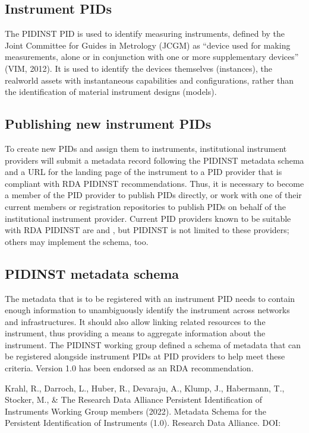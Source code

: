 \documentclass[a4paper,10pt,english]{sphinxmanual}
\begin{document}
\subsection{Instrument PIDs}
\label{\detokenize{white-paper/instrument-pids:instrument-pids}}\label{\detokenize{white-paper/instrument-pids::doc}}
\sphinxAtStartPar
The PIDINST PID is used to identify measuring instruments, defined by
the Joint Committee for Guides in Metrology (JCGM) as “device used for
making measurements, alone or in conjunction with one or more
supplementary devices” (VIM, 2012). It is used to identify the devices
themselves (instances), the real\sphinxhyphen{}world assets with instantaneous
capabilities and configurations, rather than the identification of
material instrument designs (models).


\subsection{Publishing new instrument PIDs}
\label{\detokenize{white-paper/publishing:publishing-new-instrument-pids}}\label{\detokenize{white-paper/publishing::doc}}
\sphinxAtStartPar
To create new PIDs and assign them to instruments, institutional
instrument providers will submit a metadata record following the PIDINST
metadata schema and a URL for the landing page of the instrument to a
PID provider that is compliant with RDA PIDINST recommendations. Thus,
it is necessary to become a member of the PID provider to publish PIDs
directly, or work with one of their current members or registration
repositories to publish PIDs on behalf of the institutional instrument
provider. Current PID providers known to be suitable with RDA PIDINST
are  and , but PIDINST is not limited to these
providers; others may implement the schema, too.


\subsection{PIDINST metadata schema}
\label{\detokenize{white-paper/metadata-schema:pidinst-metadata-schema}}\label{\detokenize{white-paper/metadata-schema:id1}}\label{\detokenize{white-paper/metadata-schema::doc}}
\sphinxAtStartPar
The metadata that is to be registered with an instrument PID needs to
contain enough information to unambiguously identify the instrument
across networks and infrastructures.  It should also allow linking
related resources to the instrument, thus providing a means to
aggregate information about the instrument.  The PIDINST working group
defined a schema of metadata that can be registered alongside
instrument PIDs at PID providers to help meet these criteria.  Version
1.0 has been endorsed as an RDA recommendation.%
\begin{footnote}[1]\sphinxAtStartFootnote
Krahl, R., Darroch, L., Huber, R., Devaraju, A., Klump, J., Habermann, T.,
Stocker, M., \& The Research Data Alliance Persistent Identification of
Instruments Working Group members (2022). Metadata Schema for the
Persistent Identification of Instruments (1.0). Research Data Alliance.
DOI: 
%
\end{footnote}
\end{document}
